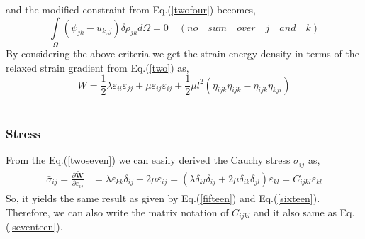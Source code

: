 \documentclass[12pt]{article}
\begin{document}
and the modified constraint from Eq.(\ref{twofour}) becomes,
\begin{equation}
\int\limits_\Omega\! (\psi_{jk} - u_{k,j})\delta\rho_{jk}  d\Omega = 0  \quad (no \quad sum\quad over \quad j \quad and \quad k)
\end{equation} 
By considering the above criteria we get the strain energy density in terms of the relaxed strain gradient from Eq.(\ref{two}) as,
\begin{equation}\label{twoseven}
W = \frac{1}{2}\lambda\varepsilon_{ii}\varepsilon_{jj}+\mu\varepsilon_{ij}\varepsilon_{ij} +\frac{1}{2}\mu l^2 ( \eta_{ijk}\eta_{ijk} - \eta_{ijk}\eta_{kji} )
\end{equation}
\\
\subsubsection{ Stress}
From the Eq.(\ref{twoseven}) we can easily derived the Cauchy stress $\sigma_{ij}$ as,
\begin{equation}\label{twoeight}
\begin{aligned}
\bar{\sigma}_{ij} = \frac{\partial \tilde{\mathbf{W}} }{\partial \varepsilon_{ij}} &=  \lambda\varepsilon_{kk}\delta_{ij} +2\mu\varepsilon_{ij} = (\lambda\delta_{kl}\delta_{ij} + 2\mu\delta_{ik}\delta_{jl})\varepsilon_{kl} = C_{ijkl} \varepsilon_{kl}
\end{aligned}
\end{equation} 
So, it yields the same result as given by Eq.(\ref{fifteen}) and Eq.(\ref{sixteen}). Therefore, we can also write the matrix notation of $ C_{ijkl} $ and it also same as Eq.(\ref{seventeen}).
\end{document}
